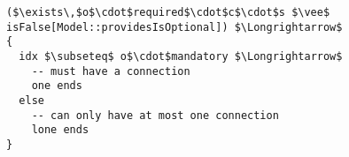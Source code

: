 \lstset{frame=tb, aboveskip=12pt, belowskip=-3pt, breaklines=true, basicstyle=\small\ttfamily, tabsize=2, mathescape=true}
\begin{lstlisting}[caption={wellformed\_components.als, lines 175-183}, label=alloy:WF_PORT_PROVIDES_ONLY, captionpos=b]
($\exists\,$o$\cdot$required$\cdot$c$\cdot$s $\vee$ isFalse[Model::providesIsOptional]) $\Longrightarrow$
{
  idx $\subseteq$ o$\cdot$mandatory $\Longrightarrow$
    -- must have a connection
    one ends
  else
    -- can only have at most one connection
    lone ends
}
\end{lstlisting}